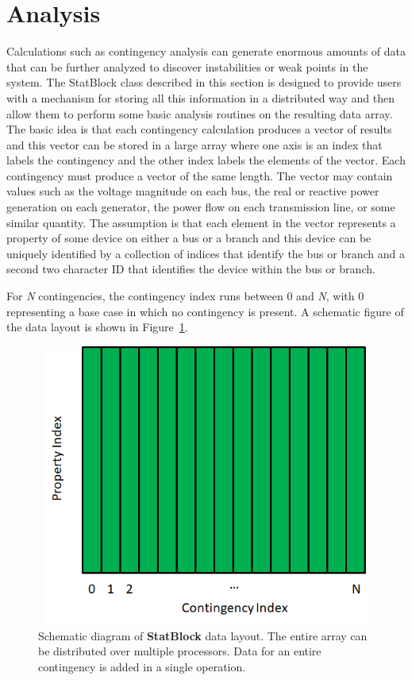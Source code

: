 \section{Analysis}

Calculations such as contingency analysis can generate enormous amounts of data that can be further analyzed to discover instabilities or weak points in the system. The StatBlock class described in this section is designed to provide users with a mechanism for storing all this information in a distributed way and then allow them to perform some basic analysis routines on the resulting data array. The basic idea is that each contingency calculation produces a vector of results and this vector can be stored in a large array where one axis is an index that labels the contingency and the other index labels the elements of the vector. Each contingency must produce a vector of the same length. The vector may contain values such as the voltage magnitude on each bus, the real or reactive power generation on each generator, the power flow on each transmission line, or some similar quantity. The assumption is that each element in the vector represents a property of some device on either a bus or a branch and this device can be uniquely identified by a collection of indices that identify the bus or branch and a second two character ID that identifies the device within the bus or branch.

For \textit{N} contingencies, the contingency index runs between 0 and \textit{N}, with 0 representing a base case in which no contingency is present. A schematic figure of the data layout is shown in Figure~\ref{fig:fig-13}.

\begin{figure}
  \centering
    \includegraphics*[width=4.81in, height=3.65in, keepaspectratio=true]{Fig13}
  \caption{Schematic diagram of \textbf{StatBlock} data layout. The entire array can be distributed over multiple processors. Data for an entire contingency is added in a single operation.}
  \label{fig:fig-13}
\end{figure}

